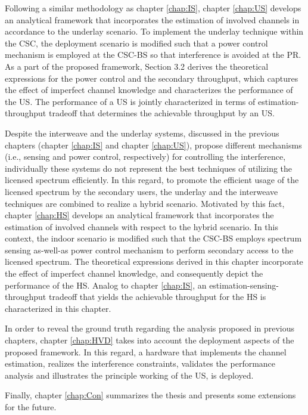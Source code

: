 Following a similar methodology as chapter \ref{chap:IS}, chapter \ref{chap:US} develops an analytical framework that incorporates the estimation of involved channels in accordance to the underlay scenario. To implement the underlay technique within the CSC, the deployment scenario is modified such that a power control mechanism is employed at the CSC-BS so that interference is avoided at the PR. As a part of the proposed framework, Section 3.2 derives the theoretical expressions for the power control and the secondary throughput, which captures the effect of imperfect channel knowledge and characterizes the performance of the US. The performance of a US is jointly characterized in terms of estimation-throughput tradeoff that determines the achievable throughput by an US. 

Despite the interweave and the underlay systems, discussed in the previous chapters (chapter \ref{chap:IS} and chapter \ref{chap:US}), propose different mechanisms (i.e., sensing and power control, respectively) for controlling the interference, individually these systems do not represent the best techniques of utilizing the licensed spectrum efficiently. In this regard, to promote the efficient usage of the licensed spectrum by the secondary users, the underlay and the interweave techniques are combined to realize a hybrid scenario. Motivated by this fact, chapter \ref{chap:HS} develops an analytical framework that incorporates the estimation of involved channels with respect to the hybrid scenario. In this context, the indoor scenario is modified such that the CSC-BS employs spectrum sensing as-well-as power control mechanism to perform secondary access to the licensed spectrum. The theoretical expressions derived in this chapter incorporate the effect of imperfect channel knowledge, and consequently depict the performance of the HS. Analog to chapter \ref{chap:IS}, an estimation-sensing-throughput tradeoff that yields the achievable throughput for the HS is characterized in this chapter. 

 
In order to reveal the ground truth regarding the analysis proposed in previous chapters, chapter \ref{chap:HVD} takes into account the deployment aspects of the proposed framework. In this regard, a hardware that implements the channel estimation, realizes the interference constraints, validates the performance analysis and illustrates the principle working of the US, is deployed.   

Finally, chapter \ref{chap:Con} summarizes the thesis and presents some extensions for the future. 
